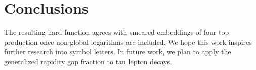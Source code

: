 \section{Conclusions}\label{sec:conclusions}

The resulting hard function agrees with smeared embeddings of four-top
production once non-global logarithms are included. We hope this work
inspires further research into symbol letters. In future work, we plan
to apply the generalized rapidity gap fraction to tau lepton decays.

